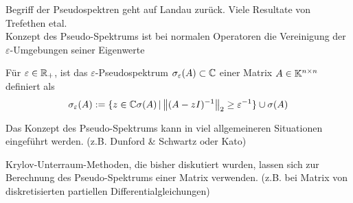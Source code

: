 Begriff der Pseudospektren geht auf Landau zurück. Viele Resultate von Trefethen etal. \\
Konzept des Pseudo-Spektrums ist bei normalen Operatoren die Vereinigung der $\varepsilon$-Umgebungen seiner Eigenwerte

\begin{defbox}
  Für $\varepsilon\in\mathbb R_+$, ist das $\varepsilon$-Pseudospektrum $\sigma_\varepsilon(A)\subset\mathbb C  $ 
  einer Matrix $A\in\mathbb K^{n\times n}$ definiert als 
  \begin{align*}
    \sigma_\varepsilon(A) := \{z\in\C  \sigma(A)\,|\, \vertn{2}{(A-zI)^{-1}}_2\geq \varepsilon^{-1}\} \cup \sigma(A)
  \end{align*}
\end{defbox}

\begin{rembox}
  Das Konzept des Pseudo-Spektrums kann in viel allgemeineren Situationen eingeführt werden. 
  (z.B. Dunford \& Schwartz oder Kato)
\end{rembox}

\begin{rembox}
  Krylov-Unterraum-Methoden, die bisher diskutiert wurden, lassen sich zur Berechnung des Pseudo-Spektrums einer 
  Matrix verwenden. (z.B. bei Matrix von diskretisierten partiellen Differentialgleichungen)
\end{rembox}

